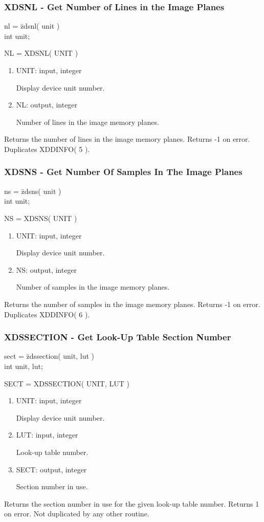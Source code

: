 \subsubsection{XDSNL - Get Number of Lines in the Image Planes}
\begin{tabbing}
nl = \=zdsnl( unit )\\
\>int  unit;\\
\end{tabbing}
NL = XDSNL( UNIT )
\begin{enumerate}
\item UNIT:  input, integer

Display device unit number.
\item NL:  output, integer

Number of lines in the image memory planes.
\end{enumerate}
Returns the number of lines in the image memory planes.  Returns -1 on
error.  Duplicates XDDINFO( 5 ).
\newpage
\subsubsection{XDSNS - Get Number Of Samples In The Image Planes}
\begin{tabbing}
ns = \=zdsns( unit )\\
\>int  unit;\\
\end{tabbing}
NS = XDSNS( UNIT )
\begin{enumerate}
\item UNIT:  input, integer

Display device unit number.
\item NS:  output, integer

Number of samples in the image memory planes.
\end{enumerate}
Returns the number of samples in the image memory planes.  Returns -1 on
error.  Duplicates XDDINFO( 6 ).
\newpage
\subsubsection{XDSSECTION - Get Look-Up Table Section Number}
\begin{tabbing}
sect = \=zdssection( unit, lut )\\
\>int  unit, lut;\\
\end{tabbing}
SECT = XDSSECTION( UNIT, LUT )
\begin{enumerate}
\item UNIT:  input, integer

Display device unit number.
\item LUT:  input, integer

Look-up table number.
\item SECT:  output, integer

Section number in use.
\end{enumerate}
Returns the section number in use for the given look-up table number.
Returns 1 on error.  Not duplicated by any other routine.
\newpage
